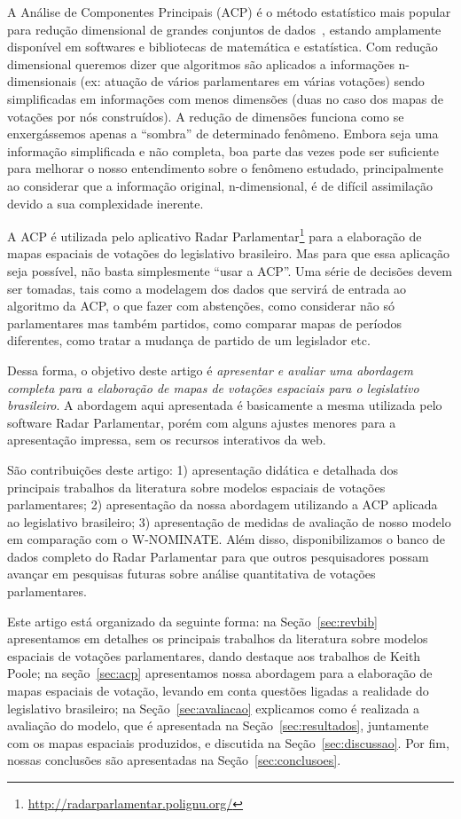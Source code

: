 \documentclass[a4paper, 12pt]{article}
\newcommand\wnominate{W-NOMINATE\xspace}
\begin{document}
A Análise de Componentes Principais (ACP) é o método estatístico mais popular para redução dimensional de grandes conjuntos de dados~\cite{DataMining2003}, estando amplamente disponível em softwares e bibliotecas de matemática e estatística. Com redução dimensional queremos dizer que algoritmos são aplicados a informações n-dimensionais (ex: atuação de vários parlamentares em várias votações) sendo simplificadas em informações com menos dimensões (duas no caso dos mapas de votações por nós construídos). A redução de dimensões funciona como se enxergássemos apenas a ``sombra'' de determinado fenômeno. Embora seja uma informação simplificada e não completa, boa parte das vezes pode ser suficiente para melhorar o nosso entendimento sobre o fenômeno estudado, principalmente ao considerar que a informação original, n-dimensional, é de difícil assimilação devido a sua complexidade inerente.

A ACP é utilizada pelo aplicativo Radar Parlamentar\footnote{\url{http://radarparlamentar.polignu.org/}} para a elaboração de mapas espaciais de votações do legislativo brasileiro. Mas para que essa aplicação seja possível, não basta simplesmente ``usar a ACP''. Uma série de decisões devem ser tomadas, tais como a modelagem dos dados que servirá de entrada ao algoritmo da ACP, o que fazer com abstenções, como considerar não só parlamentares mas também partidos, como comparar mapas de períodos diferentes, como tratar a mudança de partido de um legislador etc.

Dessa forma, o objetivo deste artigo é \emph{apresentar e avaliar uma abordagem completa para a elaboração de mapas de votações espaciais para o legislativo brasileiro}. A abordagem aqui apresentada é basicamente a mesma utilizada pelo software Radar Parlamentar, porém com alguns ajustes menores para a apresentação impressa, sem os recursos interativos da web.

São contribuições deste artigo: 1) apresentação didática e detalhada dos principais trabalhos da literatura sobre modelos espaciais de votações parlamentares; 2) apresentação da nossa abordagem utilizando a ACP aplicada ao legislativo brasileiro; 3) apresentação de medidas de avaliação de nosso modelo em comparação com o \wnominate. Além disso, disponibilizamos o banco de dados completo do Radar Parlamentar para que outros pesquisadores possam avançar em pesquisas futuras sobre análise quantitativa de votações parlamentares.

Este artigo está organizado da seguinte forma: na Seção~\ref{sec:revbib} apresentamos em detalhes os principais trabalhos da literatura sobre modelos espaciais de votações parlamentares, dando destaque aos trabalhos de Keith Poole; na seção~\ref{sec:acp} apresentamos nossa abordagem para a elaboração de mapas espaciais de votação, levando em conta questões ligadas a realidade do legislativo brasileiro; na Seção~\ref{sec:avaliacao} explicamos como é realizada a avaliação do modelo, que é apresentada na Seção~\ref{sec:resultados}, juntamente com os mapas espaciais produzidos, e discutida na Seção~\ref{sec:discussao}. Por fim, nossas conclusões são apresentadas na Seção~\ref{sec:conclusoes}.
\end{document}
